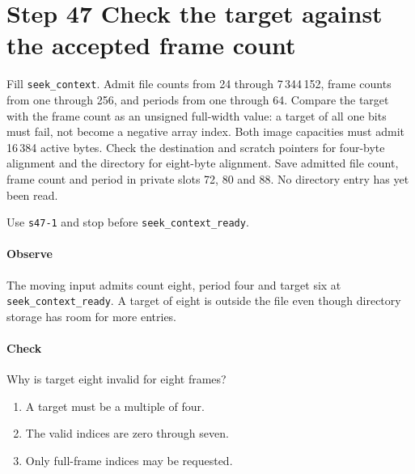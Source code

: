 \section{Step 47 Check the target against the accepted frame count}
Fill \texttt{seek\_context}. Admit file counts from 24 through 7\,344\,152, frame counts from one through 256, and periods from one through 64. Compare the target with the frame count as an unsigned full-width value: a target of all one bits must fail, not become a negative array index. Both image capacities must admit 16\,384 active bytes. Check the destination and scratch pointers for four-byte alignment and the directory for eight-byte alignment. Save admitted file count, frame count and period in private slots 72, 80 and 88. No directory entry has yet been read.

Use \texttt{s47-1} and stop before \texttt{seek\_context\_ready}.

\paragraph{Observe} The moving input admits count eight, period four and target six at \texttt{seek\_context\_ready}. A target of eight is outside the file even though directory storage has room for more entries.

\paragraph{Check} Why is target eight invalid for eight frames?
\begin{enumerate}[label=\Alph*.]
\item A target must be a multiple of four.
\item The valid indices are zero through seven.
\item Only full-frame indices may be requested.
\end{enumerate}

